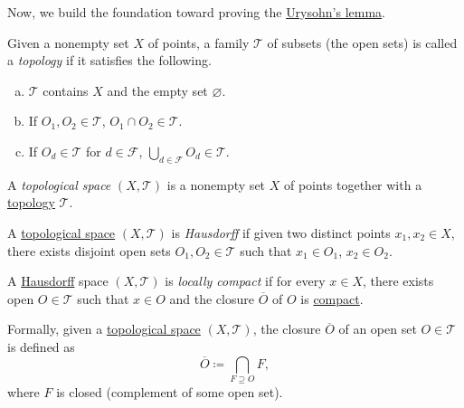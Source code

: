 Now, we build the foundation toward proving the \hyperref[thm:Urysohn-lemma]{Urysohn's lemma}.

\begin{definition}[Topology]\label{def:topology}
	Given a nonempty set \(X\) of points, a family \(\mathcal{T} \) of subsets (the open sets) is called a \emph{topology} if it satisfies the following.
	\begin{enumerate}[(a)]
		\item \(\mathcal{T} \) contains \(X\) and the empty set \(\varnothing \).
		\item If \(O_1, O_2 \in \mathcal{T} \), \(O_1 \cap O_2\in \mathcal{T} \).
		\item If \(O_d \in \mathcal{T} \) for \(d\in \mathcal{F}\), \(\bigcup_{d\in \mathcal{F} } O_d \in \mathcal{T} \).
	\end{enumerate}
\end{definition}

\begin{definition}\label{def:topological-space}
	A \emph{topological space} \((X, \mathcal{T})\) is a nonempty set \(X\) of points together with a \hyperref[def:topology]{topology} \(\mathcal{T}\).
\end{definition}

\begin{definition}[Hausdorff]\label{def:Hausdorff}
	A \hyperref[def:topological-space]{topological space} \((X, \mathcal{T})\) is \emph{Hausdorff} if given two distinct points \(x_1, x_2\in X\), there exists disjoint open sets \(O_1, O_2\in \mathcal{T} \) such that \(x_1\in O_1\), \(x_2\in O_2\).
\end{definition}

\begin{definition}\label{def:locally-compact}
	A \hyperref[def:Hausdorff]{Hausdorff} space \((X, \mathcal{T})\) is \emph{locally compact} if for every \(x\in X\), there exists open \(O\in \mathcal{T} \) such that \(x\in O\) and the closure \(\overline{O} \) of \(O\) is \hyperref[def:compact]{compact}.
\end{definition}

\begin{remark}[Closure]
	Formally, given a \hyperref[def:topological-space]{topological space} \((X, \mathcal{T} )\), the closure \(\overline{O} \) of an open set \(O\in \mathcal{T} \) is defined as
	\[
		\overline{O} \coloneqq \bigcap_{F \supseteq O} F,
	\]
	where \(F\) is closed (complement of some open set).
\end{remark}

